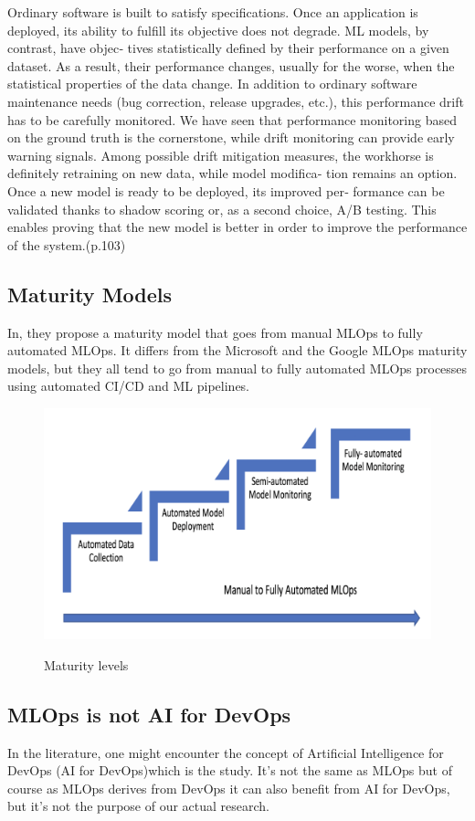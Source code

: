 Ordinary software is built to satisfy specifications. Once an application is deployed,
its ability to fulfill its objective does not degrade. ML models, by contrast, have objec‐
tives statistically defined by their performance on a given dataset. As a result, their
performance changes, usually for the worse, when the statistical properties of the data
change.
In addition to ordinary software maintenance needs (bug correction, release
upgrades, etc.), this performance drift has to be carefully monitored. We have seen
that performance monitoring based on the ground truth is the cornerstone, while
drift monitoring can provide early warning signals. Among possible drift mitigation
measures, the workhorse is definitely retraining on new data, while model modifica‐
tion remains an option. Once a new model is ready to be deployed, its improved per‐
formance can be validated thanks to shadow scoring or, as a second choice, A/B
testing. This enables proving that the new model is better in order to improve the
performance of the system.\cite{treveil2020introducing}(p.103)


\subsection{Maturity Models}\label{subsec:matutiry-models}
In\cite{mlops-maturity-model}, they propose a maturity model that goes from manual MLOps to fully automated MLOps.
It differs from the Microsoft and the Google MLOps maturity models,
but they all tend to go from manual to fully automated MLOps processes using automated CI/CD and
ML pipelines.\cite{mlops-definition-tools-and-challenge}

\begin{figure}[!htbp]
    \caption{Maturity levels \cite{mlops-maturity-model}}
    \centering
    \includegraphics[scale=0.5]{images/maturity-levels}
    \label{fig:maturity}
\end{figure}


\subsection{MLOps is not AI for DevOps}\label{subsec:mlops-is-not-ai-for-devops}
In the literature, one might encounter the concept of Artificial Intelligence for DevOps (AI for DevOps)which is the study.
It's not the same as MLOps but of course as MLOps derives from DevOps it can also benefit from AI for DevOps,
but it's not the purpose of our actual research.